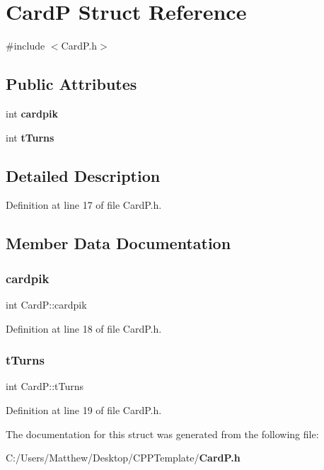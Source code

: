 \section{CardP Struct Reference}
\label{struct_card_p}


{\ttfamily \#include $<$Card\+P.\+h$>$}

\subsection*{Public Attributes}
\begin{DoxyCompactItemize}
\item 
int {\bf cardpik}
\item 
int {\bf t\+Turns}
\end{DoxyCompactItemize}


\subsection{Detailed Description}


Definition at line 17 of file Card\+P.\+h.



\subsection{Member Data Documentation}
\label{struct_card_p_add33d97876570fac9eb7d8d6fa4522e3} 
\subsubsection{cardpik}
{\footnotesize\ttfamily int Card\+P\+::cardpik}



Definition at line 18 of file Card\+P.\+h.

\label{struct_card_p_a1c4eda14c61540226653e2b745ff9619} 
\subsubsection{t\+Turns}
{\footnotesize\ttfamily int Card\+P\+::t\+Turns}



Definition at line 19 of file Card\+P.\+h.



The documentation for this struct was generated from the following file\+:\begin{DoxyCompactItemize}
\item 
C\+:/\+Users/\+Matthew/\+Desktop/\+C\+P\+P\+Template/{\bf Card\+P.\+h}\end{DoxyCompactItemize}
